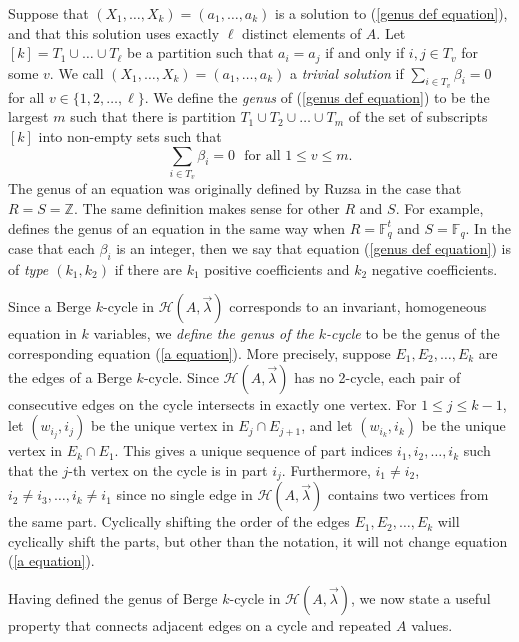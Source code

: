 \documentclass[12pt]{article}%
\begin{document}
Suppose that $(X_1 , \dots , X_k ) = (a_1 , \dots , a_k)$ is a solution to (\ref{genus def equation}), and that this solution uses exactly $\ell$ distinct elements of $A$.  Let $[k] = T_1 \cup \dots \cup T_{ \ell}$ be a partition such that $a_i = a_j$ if and only if $i,j \in T_v$ for some $v$.
We call $(X_1, \dots , X_k) = (a_1 , \dots , a_k)$ a \emph{trivial solution} if $\sum_{i \in T_v}  \beta_i = 0$ for all $v \in \{1 ,2 , \dots , \ell \}$.  
We define the \emph{genus} of (\ref{genus def equation}) to be the largest $m$ such that there is partition $T_1 \cup T_2 \cup \dots \cup T_m$ of 
the set of subscripts $[ k ] $ into non-empty sets such that 
\[
\sum_{i \in T_v } \beta_i = 0 ~~~\mbox{for all $1 \leq v \leq m$.}
\]
The genus of an equation was originally defined by Ruzsa \cite{Ruzsa} in the case that $R=S = \mathbb{Z}$.  The same definition makes sense for other $R$ and $S$. For example, \cite{MT} defines the genus of an equation in the same way when $R = \mathbb{F}_q^t$ and $S=\mathbb{F}_q$. In the case that each $\beta_i$ is an integer, then we say that equation (\ref{genus def equation}) is of \emph{type $(k_1,k_2)$} if there are $k_1$ positive coefficients and $k_2$ negative coefficients.  

Since a Berge $k$-cycle in $\mathcal{H}(A , \vec{ \lambda})$ corresponds to an 
invariant, homogeneous equation in $k$ variables, we \emph{define the genus of the $k$-cycle} to be the genus of the corresponding equation (\ref{a equation}). 
More precisely, suppose $E_1, E_2, \dots ,E_k$ are the edges of a Berge $k$-cycle.  Since $\mathcal{H}(A , \vec{ \lambda}) $ has no 2-cycle, each pair of consecutive edges on the cycle intersects in exactly one vertex.  For $1 \leq j \leq k -1$, let $(w_{i_j} , i_j )$ be the unique vertex in $E_j \cap E_{j+1}$, and 
let $(w_{i_k} , i_k)$ be the unique vertex in $E_k \cap E_1$.  This gives a unique sequence of part indices $i_1 , i_2 , \dots , i_k$ such that the $j$-th vertex on the cycle is in part $i_j$.  Furthermore,
$i_1 \neq i_2$, $i_2 \neq i_3, \dots , i_k \neq i_1$ since no single edge in $\mathcal{H}( A , \vec{ \lambda})$ contains two vertices from the same part.  
Cyclically shifting the order of the edges $E_1, E_2 ,\dots , E_k$ will cyclically shift the parts, but other than the notation, it will not change equation (\ref{a equation}).  

Having defined the genus of Berge $k$-cycle in $\mathcal{H}(A , \vec{ \lambda})$, we now state 
a useful property that connects adjacent edges on a cycle and repeated $A$ values.  
\end{document}
